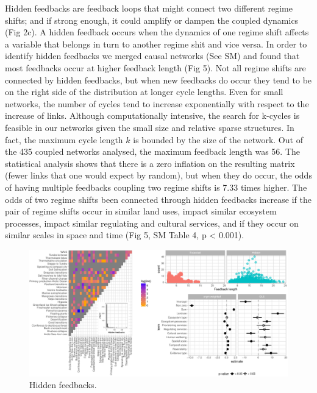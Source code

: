\documentclass[9pt,]{article}
\begin{document}
Hidden feedbacks are feedback loops that might connect two different
regime shifts; and if strong enough, it could amplify or dampen the
coupled dynamics (Fig 2c). A hidden feedback occurs when the dynamics of
one regime shift affects a variable that belongs in turn to another
regime shit and vice versa. In order to identify hidden feedbacks we
merged causal networks (See SM) and found that most feedbacks occur at
higher feedback length (Fig 5). Not all regime shifts are connected by
hidden feedbacks, but when new feedbacks do occur they tend to be on the
right side of the distribution at longer cycle lengths. Even for small
networks, the number of cycles tend to increase exponentially with
respect to the increase of links. Although computationally intensive,
the search for k-cycles is feasible in our networks given the small size
and relative sparse structures. In fact, the maximum cycle length \(k\)
is bounded by the size of the network. Out of the 435 coupled networks
analysed, the maximum feedback length was 56. The statistical analysis
shows that there is a zero inflation on the resulting matrix (fewer
links that one would expect by random), but when they do occur, the odds
of having multiple feedbacks coupling two regime shifts is 7.33 times
higher. The odds of two regime shifts been connected through hidden
feedbacks increase if the pair of regime shifts occur in similar land
uses, impact similar ecosystem processes, impact similar regulating and
cultural services, and if they occur on similar scales in space and time
(Fig 5, SM Table 4, p \textless{} 0.001).

\begin{figure}

{\centering \includegraphics{170830_draftCascadingEffects_files/figure-latex/Fig5-1} 

}

\caption{Hidden feedbacks.}\label{fig:Fig5}
\end{figure}
\end{document}
